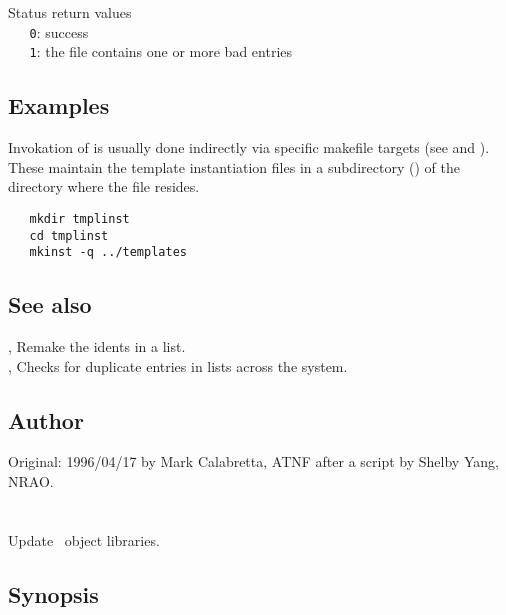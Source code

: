 Status return values
\\ \verb+   0+: success
\\ \verb+   1+: the  file contains one or more bad entries
 
\subsection*{Examples}
 
Invokation of  is usually done indirectly via specific makefile
targets (see  and ).  These maintain the template instantiation
files in a subdirectory () of the directory where the
 file resides. 
 
\begin{verbatim}
   mkdir tmplinst
   cd tmplinst
   mkinst -q ../templates
\end{verbatim}
 
\subsection*{See also}
 
, Remake the idents in a  list.\\
, Checks for duplicate entries in  lists
   across the system.
 
\subsection*{Author}
 
Original: 1996/04/17 by Mark Calabretta, ATNF after a  script by
Shelby Yang, NRAO.
 

\newpage
\section{}
\label{updatelib}

Update \aipspp\ object libraries.

\subsection*{Synopsis}

